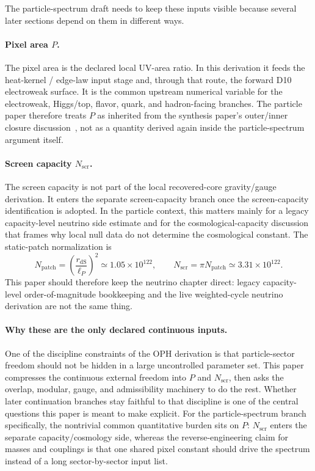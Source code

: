 \documentclass[11pt]{article}
\begin{document}
The particle-spectrum draft needs to keep these inputs visible because several later sections
depend on them in different ways.

\paragraph{Pixel area \(P\).}
The pixel area is the declared local UV-area ratio. In this derivation it feeds the heat-kernel /
edge-law input stage and, through that route, the forward D10 electroweak surface. It is the
common upstream numerical variable for the electroweak, Higgs/top, flavor, quark, and
hadron-facing branches. The particle paper therefore treats \(P\) as inherited from the synthesis
paper's outer/inner closure discussion~\cite{ophsynthesis}, not as a quantity derived again inside
the particle-spectrum argument itself.

\paragraph{Screen capacity \(N_{\mathrm{scr}}\).}
The screen capacity is not part of the local recovered-core gravity/gauge derivation. It enters
the separate screen-capacity branch once the screen-capacity identification is adopted. In the
particle context, this matters mainly for a legacy capacity-level neutrino side estimate and for the
cosmological-capacity discussion that frames why local null data do not determine the
cosmological constant. The static-patch normalization is
\[
N_{\mathrm{patch}}=\left(\frac{r_{\mathrm{dS}}}{\ell_P}\right)^2\simeq1.05\times10^{122},
\qquad
N_{\mathrm{scr}}=\pi N_{\mathrm{patch}}\simeq3.31\times10^{122}.
\]
This paper should therefore keep the neutrino chapter direct:
legacy capacity-level order-of-magnitude bookkeeping and the live weighted-cycle neutrino derivation are not the
same thing.

\paragraph{Why these are the only declared continuous inputs.}
One of the discipline constraints of the OPH derivation is that particle-sector freedom should not
be hidden in a large uncontrolled parameter set. This paper compresses the
continuous external freedom into \(P\) and \(N_{\mathrm{scr}}\), then asks the overlap,
modular, gauge, and admissibility machinery to do the rest. Whether later continuation branches
stay faithful to that discipline is one of the central questions this paper is meant to
make explicit. For the particle-spectrum branch specifically, the nontrivial common quantitative
burden sits on \(P\): \(N_{\mathrm{scr}}\) enters the separate capacity/cosmology side, whereas
the reverse-engineering claim for masses and couplings is that one shared pixel constant should
drive the spectrum instead of a long sector-by-sector input list.
\end{document}
